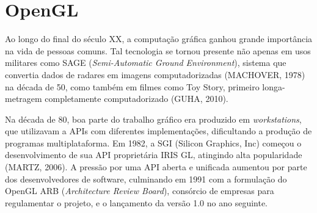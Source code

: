\chapter{OpenGL}
Ao longo do final do século XX, a computação gráfica ganhou grande importância na vida de pessoas comuns. Tal tecnologia se tornou presente não apenas em usos militares como SAGE (\textit{Semi-Automatic Ground Environment}), sistema que convertia dados de radares em imagens computadorizadas \cite{sage} (MACHOVER, 1978) na década de 50, como também em filmes como Toy Story, primeiro longa-metragem completamente computadorizado \cite{toystory} (GUHA, 2010).

Na década de 80, boa parte do trabalho gráfico era produzido em \textit{workstations}, que utilizavam a APIs com diferentes implementações, dificultando a produção de programas multiplataforma. Em 1982, a SGI (Silicon Graphics, Inc) começou o desenvolvimento de sua API proprietária IRIS GL, atingindo alta popularidade \cite{irisgl} (MARTZ, 2006). A pressão por uma API aberta e unificada aumentou por parte dos desenvolvedores de software, culminando em 1991 com a formulação do OpenGL ARB (\textit{Architecture Review Board}), consórcio de empresas para regulamentar o projeto, e o lançamento da versão 1.0 no ano seguinte.